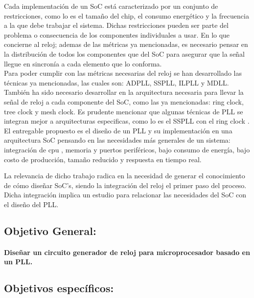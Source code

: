 \documentclass[runningheads,a4paper]{llncs}
\begin{document}
Cada implementación de un SoC está caracterizado por un conjunto de restricciones, como lo es el tamaño del chip, el consumo energético y la frecuencia a la que debe trabajar el sistema. Dichas restricciones pueden ser parte del problema o consecuencia de los componentes individuales a usar. En lo que concierne al reloj; ademas de las métricas ya mencionadas, es necesario pensar en la distribución de todos los componentes que del SoC para asegurar que la señal llegue en sincronía a cada elemento que lo conforma.\\

Para poder cumplir con las métricas necesarias del reloj se han desarrollado las técnicas ya mencionadas, las cuales son: ADPLL, SSPLL, ILPLL y MDLL. También ha sido necesario desarrollar en la arquitectura necesaria para llevar la señal de reloj a cada componente del SoC, como las ya mencionadas: ring clock, tree clock y mesh clock. Es prudente mencionar que algunas técnicas de PLL se integran mejor a arquitecturas especificas, como lo es el SSPLL con el ring clock . El entregable propuesto es el diseño de un PLL y su implementación en una arquitectura SoC pensando en las necesidades más generales de un sistema: integración de cpu , memoria y puertos periféricos, bajo consumo de energía, bajo costo de producción, tamaño reducido y respuesta en tiempo real. 

La relevancia de dicho trabajo radica en la necesidad de generar el conocimiento de cómo diseñar SoC's, siendo la integración del reloj el primer paso del proceso. Dicha integración implica un estudio para relacionar las necesidades del SoC con el diseño del PLL. 


\subsection{Objetivo General:}
\paragraph{Diseñar un circuito generador de reloj para microprocesador basado en un PLL.}
\subsection{Objetivos específicos:}
\end{document}
